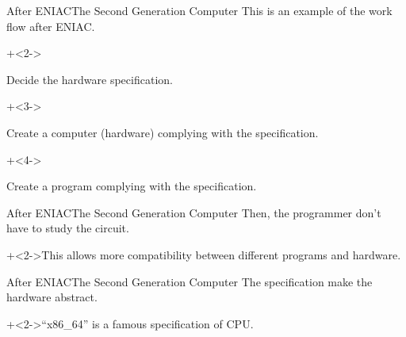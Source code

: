 \begin{frame}{After ENIAC}{The Second Generation Computer}
    This is an example of the work flow after ENIAC.
    \vspace{4ex}

    \begin{enumerate}
        \onslide+<2->{\item Decide the hardware specification.}
        \onslide+<3->{\item Create a computer (hardware) complying with the specification.}
        \onslide+<4->{\item Create a program complying with the specification.}
    \end{enumerate}
\end{frame}


\begin{frame}{After ENIAC}{The Second Generation Computer}
    Then, the programmer don't have to study the circuit.
    \vspace{4ex}

    \onslide+<2->{This allows more compatibility between different programs and hardware.}
\end{frame}


\begin{frame}{After ENIAC}{The Second Generation Computer}
    The specification make the hardware abstract.
    \vspace{4ex}

    \onslide+<2->{{\footnotesize ``x86\_64'' is a famous specification of CPU.}}
\end{frame}
